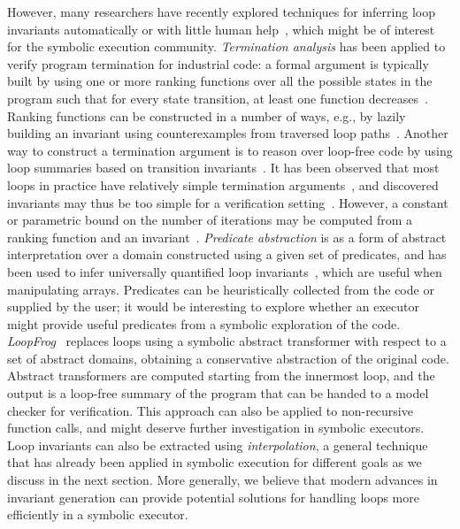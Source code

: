 {%
However, many researchers have recently explored techniques for inferring loop invariants automatically or with little human help~\cite{FMV-CSUR14}, which might be of interest for the symbolic execution community.
%
{\em Termination analysis} has been applied to verify program termination for industrial code: a formal argument is typically built by using one or more ranking functions over all the possible states in the program such that for every state transition, at least one function decreases~\cite{CPR-PLDI06}. Ranking functions can be constructed in a number of ways, e.g., by lazily building an invariant using counterexamples from traversed loop paths~\cite{GMR-PLDI15}. Another way to construct a termination argument is to reason over loop-free code by using loop summaries based on transition invariants~\cite{TSW-TACAS11}. It has been observed that most loops in practice have relatively simple termination arguments~\cite{TSW-TACAS11}, and discovered invariants may thus be too simple for a verification setting~\cite{GFM-TSE15}. However, a constant or parametric bound on the number of iterations may be computed from a ranking function and an invariant~\cite{GMR-PLDI15}.
%
{\em Predicate abstraction} is as a form of abstract interpretation over a domain constructed using a given set of predicates, and has been used to infer universally quantified loop invariants~\cite{FQ-POPL02}, which are useful when manipulating arrays. Predicates can be heuristically collected from the code or supplied by the user; it would be interesting to explore whether an executor might provide useful predicates from a symbolic exploration of the code. {\em LoopFrog}~\cite{LOOPFROG-ATVA08} replaces loops using a symbolic abstract transformer with respect to a set of abstract domains, obtaining a conservative abstraction of the original code. Abstract transformers are computed starting from the innermost loop, and the output is a loop-free summary of the program that can be handed to a model checker for verification. This approach can also be applied to non-recursive function calls, and might deserve further investigation in symbolic executors. Loop invariants can also be extracted using {\em interpolation}, a general technique that has already been applied in symbolic execution for different goals as we discuss in the next section. More generally, we believe that modern advances in invariant generation can provide potential solutions for handling loops more efficiently in a symbolic executor.
}

